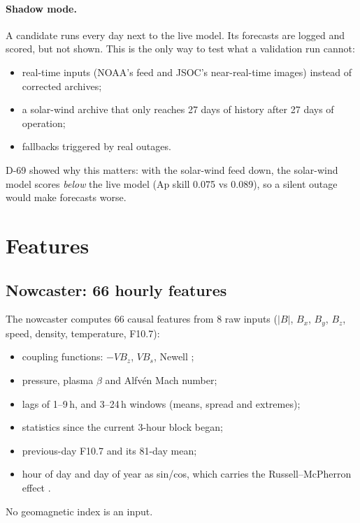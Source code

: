 \documentclass[11pt,a4paper]{article}
\begin{document}
\paragraph{Shadow mode.} A candidate runs every day next to the live model. Its forecasts are logged and scored,
but not shown. This is the only way to test what a validation run cannot:
\begin{itemize}
\item real-time inputs (NOAA's feed and JSOC's near-real-time images) instead of corrected archives;
\item a solar-wind archive that only reaches 27 days of history after 27 days of operation;
\item fallbacks triggered by real outages.
\end{itemize}
D-69 showed why this matters: with the solar-wind feed down, the solar-wind model scores \emph{below} the live model
(Ap skill 0.075 vs 0.089), so a silent outage would make forecasts worse.

\section{Features}
\subsection{Nowcaster: 66 hourly features}
The nowcaster computes 66 causal features from 8 raw inputs ($|B|$, $B_x$, $B_y$, $B_z$, speed, density,
temperature, F10.7):
\begin{itemize}
\item coupling functions: $-VB_z$, $VB_s$, Newell \cite{newell2007};
\item pressure, plasma $\beta$ and Alfv\'en Mach number;
\item lags of 1--9\,h, and 3--24\,h windows (means, spread and extremes);
\item statistics since the current 3-hour block began;
\item previous-day F10.7 and its 81-day mean;
\item hour of day and day of year as sin/cos, which carries the Russell--McPherron effect \cite{russell1973}.
\end{itemize}
No geomagnetic index is an input.
\end{document}
